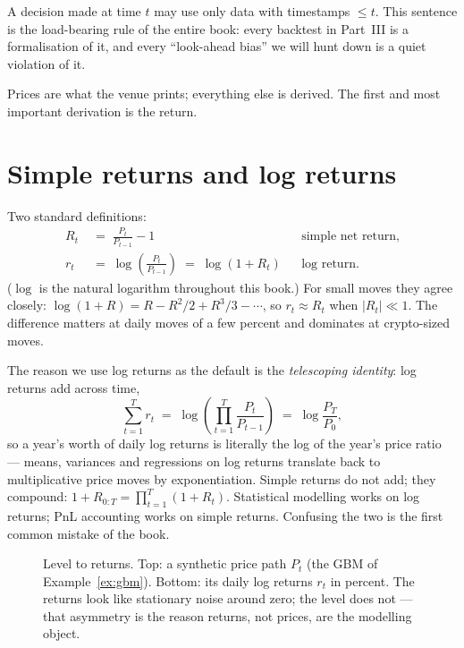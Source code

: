 \begin{principle}
A decision made at time $t$ may use only data with timestamps
$\le t$. This sentence is the load-bearing rule of the entire book:
every backtest in Part~III is a formalisation of it, and every
``look-ahead bias'' we will hunt down is a quiet violation of it.
\end{principle}

Prices are what the venue prints; everything else is derived. The
first and most important derivation is the return.

\section{Simple returns and log returns}\label{sec:returns}
Two standard definitions:
\begin{align}
R_t &\;=\; \frac{P_t}{P_{t-1}} - 1
&&\text{simple net return,} \label{eq:simple}\\
r_t &\;=\; \log\!\left(\frac{P_t}{P_{t-1}}\right) \;=\; \log(1+R_t)
&&\text{log return.} \label{eq:logret}
\end{align}
($\log$ is the natural logarithm throughout this book.) For small
moves they agree closely: $\log(1+R) = R - R^2/2 + R^3/3 - \cdots$, so
$r_t \approx R_t$ when $|R_t|\ll 1$. The difference matters at daily
moves of a few percent and dominates at crypto-sized moves.

The reason we use log returns as the default is the \emph{telescoping
identity}: log returns add across time,
\begin{equation}\label{eq:telescope}
\sum_{t=1}^{T} r_t \;=\; \log\!\left(\prod_{t=1}^{T}\frac{P_t}{P_{t-1}}\right)
\;=\; \log\frac{P_T}{P_0},
\end{equation}
so a year's worth of daily log returns is literally the log of the
year's price ratio --- means, variances and regressions on log returns
translate back to multiplicative price moves by exponentiation. Simple
returns do not add; they compound: $1 + R_{0:T} = \prod_{t=1}^{T}(1+R_t)$.
Statistical modelling works on log returns; PnL accounting works on
simple returns. Confusing the two is the first common mistake of the
book.

\begin{figure}[ht]\centering

\caption{Level to returns. Top: a synthetic price path $P_t$ (the GBM
of Example~\ref{ex:gbm}). Bottom: its daily log returns $r_t$ in
percent. The returns look like stationary noise around zero; the level
does not --- that asymmetry is the reason returns, not prices, are the
modelling object.}
\label{fig:levelret}
\end{figure}

